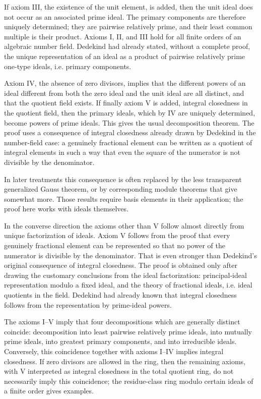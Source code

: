 \documentclass[11pt]{article}
\begin{document}
If axiom III, the existence of the unit element, is added, then the unit ideal does not occur as an associated prime ideal. The primary components are therefore uniquely determined; they are pairwise relatively prime, and their least common multiple is their product. Axioms I, II, and III hold for all finite orders of an algebraic number field. Dedekind had already stated, without a complete proof, the unique representation of an ideal as a product of pairwise relatively prime one-type ideals, i.e. primary components.

Axiom IV, the absence of zero divisors, implies that the different powers of an ideal different from both the zero ideal and the unit ideal are all distinct, and that the quotient field exists. If finally axiom V is added, integral closedness in the quotient field, then the primary ideals, which by IV are uniquely determined, become powers of prime ideals. This gives the usual decomposition theorem. The proof uses a consequence of integral closedness already drawn by Dedekind in the number-field case: a genuinely fractional element can be written as a quotient of integral elements in such a way that even the square of the numerator is not divisible by the denominator.

In later treatments this consequence is often replaced by the less transparent generalized Gauss theorem, or by corresponding module theorems that give somewhat more. Those results require basis elements in their application; the proof here works with ideals themselves.

In the converse direction the axioms other than V follow almost directly from unique factorization of ideals. Axiom V follows from the proof that every genuinely fractional element can be represented so that no power of the numerator is divisible by the denominator. That is even stronger than Dedekind's original consequence of integral closedness. The proof is obtained only after drawing the customary conclusions from the ideal factorization: principal-ideal representation modulo a fixed ideal, and the theory of fractional ideals, i.e. ideal quotients in the field. Dedekind had already known that integral closedness follows from the representation by prime-ideal powers.

The axioms I--V imply that four decompositions which are generally distinct coincide: decomposition into least pairwise relatively prime ideals, into mutually prime ideals, into greatest primary components, and into irreducible ideals. Conversely, this coincidence together with axioms I--IV implies integral closedness. If zero divisors are allowed in the ring, then the remaining axioms, with V interpreted as integral closedness in the total quotient ring, do not necessarily imply this coincidence; the residue-class ring modulo certain ideals of a finite order gives examples.
\end{document}
